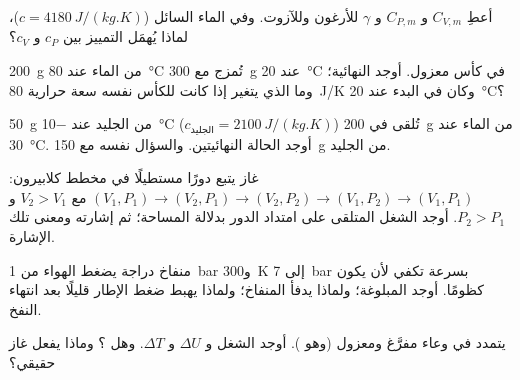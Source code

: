 \begin{exercise}[$\star$]\label{exo:b1:first-law:4}
أعطِ $C_{V,m}$ و $C_{P,m}$ و $\gamma$ للأرغون وللآزوت. وفي الماء
السائل ($c = \qty{4180}{J/(kg.K)}$)، لماذا يُهمَل التمييز بين
$c_P$ و $c_V$؟
\end{exercise}

\begin{exercise}[$\star\star$]\label{exo:b1:first-law:5}
\qty{200}{g} من الماء عند \qty{80}{\degreeCelsius} تُمزج مع \qty{300}{g}
عند \qty{20}{\degreeCelsius} في كأس معزول. أوجد  النهائية؛
وما الذي يتغير إذا كانت للكأس نفسه سعة حرارية \qty{80}{J/K} وكان
في البدء عند \qty{20}{\degreeCelsius}؟
\end{exercise}

\begin{exercise}[$\star\star$]\label{exo:b1:first-law:6}
\qty{50}{g} من الجليد عند \qty{-10}{\degreeCelsius} ($c_{\text{الجليد}} = \qty{2100}{J/(kg.K)}$)
تُلقى في \qty{200}{g} من الماء عند \qty{30}{\degreeCelsius}. أوجد الحالة
 النهائيتين. والسؤال نفسه مع \qty{150}{g} من الجليد.
\end{exercise}

\begin{exercise}[$\star\star$]\label{exo:b1:first-law:7}
غاز يتبع دورًا مستطيلًا في مخطط كلابيرون: $(V_1, P_1)
\to (V_2, P_1) \to (V_2, P_2) \to (V_1, P_2) \to (V_1, P_1)$ مع $V_2 > V_1$
و $P_2 > P_1$. أوجد الشغل المتلقى على امتداد الدور بدلالة المساحة؛
ثم إشارته ومعنى تلك الإشارة.
\end{exercise}

\begin{exercise}[$\star\star$]\label{exo:b1:first-law:8}
منفاخ دراجة يضغط الهواء من \qty{1}{bar} و\qty{300}{K} إلى
\qty{7}{bar} بسرعة تكفي لأن يكون  كظومًا. أوجد 
المبلوغة؛ ولماذا يدفأ المنفاخ؛ ولماذا يهبط ضغط الإطار قليلًا بعد
انتهاء النفخ.
\end{exercise}

\begin{exercise}[$\star\star$]\label{exo:b1:first-law:9}
 يتمدد في وعاء مفرَّغ ومعزول (وهو ). أوجد الشغل  و $\Delta U$ و $\Delta T$. وهل ؟ وماذا يفعل غاز حقيقي؟
\end{exercise}

